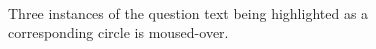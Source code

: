 \documentclass[12pt,twoside,notitlepage,xetex]{report}
\begin{document}
\begin{center}
\begin{figure}[H]
\begin{center}
\\
\vspace{0.5cm}
\end{center}
\caption{Three instances of the question text being highlighted as a corresponding circle is moused-over.}
\end{figure}
\end{center}
\end{document}
